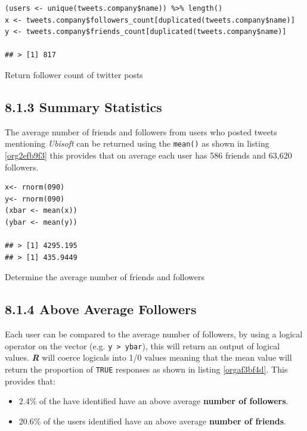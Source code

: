 \documentclass[11pt]{article}
\begin{document}
\begin{listing}[htbp]
\begin{verbatim}
(users <- unique(tweets.company$name)) %>% length()
x <- tweets.company$followers_count[duplicated(tweets.company$name)]
y <- tweets.company$friends_count[duplicated(tweets.company$name)]

## > [1] 817
\end{verbatim}
\caption{\label{orga5caa48}Return follower count of twitter posts}
\end{listing}


\subsection{8.1.3 Summary Statistics}
\label{sec:org6e27135}
The average number of friends and followers from users who posted tweets mentioning \emph{Ubisoft} can be returned using the \texttt{mean()} as shown in listing \ref{org2efb9f3}
this provides that on average each user has 586 friends and 63,620 followers.

\begin{listing}[htbp]
\begin{verbatim}
x<- rnorm(090)
y<- rnorm(090)
(xbar <- mean(x))
(ybar <- mean(y))

## > [1] 4295.195
## > [1] 435.9449
\end{verbatim}
\caption{\label{org2efb9f3}Determine the average number of friends and followers}
\end{listing}

\subsection{8.1.4 Above Average Followers}
\label{sec:org685319e}
Each user can be compared to the average number of followers, by using a logical
operator on the vector (e.g. \texttt{y > ybar}), this will return an output of logical
values. \textbf{\emph{R}} will coerce logicals into 1/0 values meaning that the mean value
will return the proportion of \texttt{TRUE} responses as shown in listing \ref{orgaf3bf4d}. This
provides that:

\begin{itemize}
\item 2.4\%  of the have identified have an above average \textbf{number of followers}.
\item 20.6\% of the users identified have an above average \textbf{number of friends}.
\end{itemize}
\end{document}
